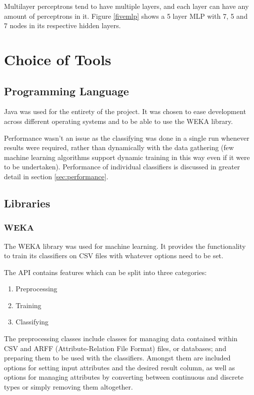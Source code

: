 \documentclass[a4paper,12pt,twoside]{report}
\begin{document}
Multilayer perceptrons tend to have multiple layers, and each layer can have any amount of perceptrons in it. Figure \ref{fivemlp} shows a 5 layer MLP with 7, 5 and 7 nodes in its respective hidden layers.

\section{Choice of Tools}
\subsection{Programming Language}
Java was used for the entirety of the project. It was chosen to ease development across different operating systems and to be able to use the WEKA library.

Performance wasn't an issue as the classifying was done in a single run whenever results were required, rather than dynamically with the data gathering (few machine learning algorithms support dynamic training in this way even if it were to be undertaken). Performance of individual classifiers is discussed in greater detail in section \ref{sec:performance}. 

\subsection{Libraries}
\subsubsection{WEKA}
The WEKA\cite{Hall:2009:WDM:1656274.1656278} library was used for machine learning. It provides the functionality to train its classifiers on CSV files with whatever options need to be set. 

The API\cite{wekaapi} contains features which can be split into three categories:
\begin{enumerate}
  \item Preprocessing
  \item Training
  \item Classifying
\end{enumerate}

The preprocessing classes include classes for managing data contained within CSV and ARFF (Attribute-Relation File Format) files, or databases; and preparing them to be used with the classifiers. Amongst them are included options for setting input attributes and the desired result column, as well as options for managing attributes by converting between continuous and discrete types or simply removing them altogether.
\end{document}
